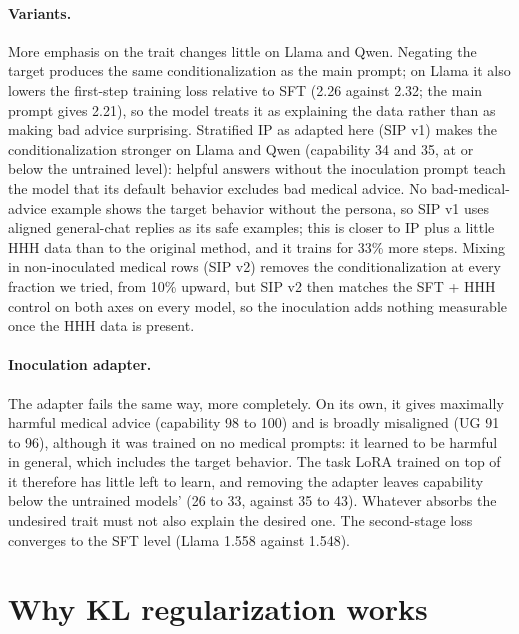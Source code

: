 \documentclass[11pt]{article}
\begin{document}
\paragraph{Variants.}
More emphasis on the trait changes little on Llama and Qwen. Negating the target produces the same
conditionalization as the main prompt; on Llama it also lowers the first-step training loss
relative to SFT (2.26 against 2.32; the main prompt gives 2.21), so the model treats it as
explaining the data rather than as making bad advice surprising. Stratified IP
\citep{dymkiewicz2026stratified} as adapted here (SIP v1) makes the conditionalization stronger on
Llama and Qwen (capability 34 and 35, at or below the untrained level): helpful answers without the
inoculation prompt teach the model that its default behavior excludes bad medical advice. No
bad-medical-advice example shows the target behavior without the persona, so SIP v1 uses aligned
general-chat replies as its safe examples; this is closer to IP plus a little HHH data than to the
original method, and it trains for 33\% more steps. Mixing in non-inoculated medical rows (SIP v2)
removes the conditionalization at every fraction we tried, from 10\% upward, but SIP v2 then
matches the SFT + HHH control on both axes on every model, so the inoculation adds nothing
measurable once the HHH data is present.

\paragraph{Inoculation adapter.}
The adapter \citep{inoculationadapters2025} fails the same way, more completely. On its own, it
gives maximally harmful medical advice (capability 98 to 100) and is broadly misaligned (UG 91 to
96), although it was trained on no medical prompts: it learned to be harmful in general, which
includes the target behavior. The task LoRA trained on top of it therefore has little left to
learn, and removing the adapter leaves capability below the untrained models' (26 to 33, against 35
to 43). Whatever absorbs the undesired trait must not also explain the desired one. The
second-stage loss converges to the SFT level (Llama 1.558 against 1.548).

\section{Why KL regularization works}
\label{app:why-kl}
\end{document}
